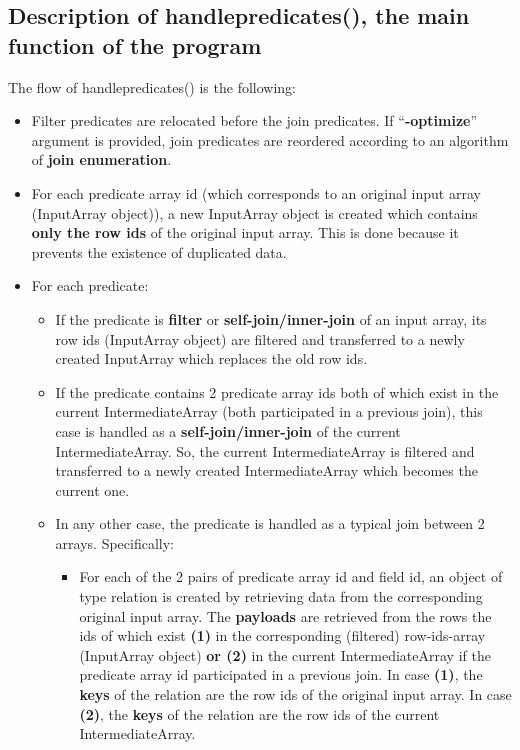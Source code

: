 \documentclass{ws-ijprai}
\begin{document}
\subsection{Description of handlepredicates(), the main function of the program}
The flow of handlepredicates() is the following:
\begin{itemize}
    \item Filter predicates are relocated before the join predicates. If “\textbf{-optimize}” argument is provided, join predicates are reordered according to an algorithm of \textbf{join enumeration}.
    \item For each predicate array id (which corresponds to an original input array (InputArray object)), a new InputArray object is created which contains \textbf{only the row ids} of the original input array. This is done because it prevents the existence of duplicated data.
    \item For each predicate:
    \begin{itemize}
        \item If the predicate is \textbf{filter} or \textbf{self-join/inner-join} of an input array, its row ids (InputArray object) are filtered and transferred to a newly created InputArray which replaces the old row ids.
        \item If the predicate contains 2 predicate array ids both of which exist in the current IntermediateArray (both participated in a previous join), this case is handled as a \textbf{self-join/inner-join} of the current IntermediateArray. So, the current IntermediateArray is filtered and transferred to a newly created IntermediateArray which becomes the current one.
        \item In any other case, the predicate is handled as a typical join between 2 arrays. Specifically:
        \begin{itemize}
            \item For each of the 2 pairs of predicate array id and field id, an object of type relation is created by retrieving data from the corresponding original input array. The \textbf{payloads} are retrieved from the rows the ids of which exist \textbf{(1)} in the corresponding (filtered) row-ids-array (InputArray object) \textbf{or (2)} in the current IntermediateArray if the predicate array id participated in a previous join. In case \textbf{(1)}, the \textbf{keys} of the relation are the row ids of the original input array. In case \textbf{(2)}, the \textbf{keys} of the relation are the row ids of the current IntermediateArray.

\end{itemize}
\end{itemize}
\end{itemize}
\end{document}
